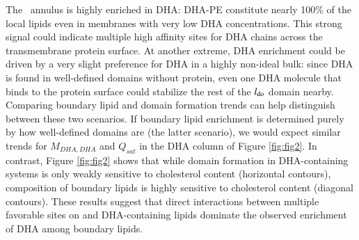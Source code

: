 	The \nachr~annulus is highly enriched in DHA: DHA-PE constitute nearly 100\% of the local lipids even in membranes with very low DHA concentrations. This strong signal could indicate multiple high affinity sites for DHA chains across the transmembrane protein surface. At another extreme, DHA enrichment could be driven by a very slight preference for DHA in a highly non-ideal bulk: since DHA is found in well-defined domains without protein, even one DHA molecule that binds to the protein surface could stabilize the rest of the $l_{\mathrm{do}}$ domain nearby. Comparing boundary lipid and domain formation trends can help distinguish between these two scenarios.  If boundary lipid enrichment is determined purely by how well-defined domains are (the latter scenario), we would expect similar trends for $M_{DHA,DHA}$ and $Q_{sat}$ in the DHA column of Figure \ref{fig:fig2}.  In contrast,  Figure \ref{fig:fig2} shows that while domain formation in DHA-containing systems is only weakly sensitive to cholesterol content (horizontal contours), composition of boundary lipids is highly sensitive to cholesterol content (diagonal contours). These results suggest that direct interactions between multiple favorable sites on \nachr and DHA-containing lipids dominate the observed enrichment of DHA among boundary lipids.  
	
